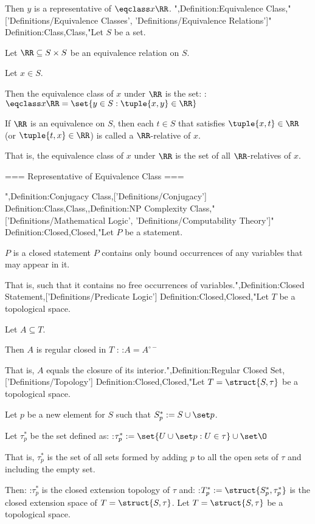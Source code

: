 Then $y$ is a representative of $\eqclass x \RR$.
",Definition:Equivalence Class,"['Definitions/Equivalence Classes', 'Definitions/Equivalence Relations']"
Definition:Class,Class,"Let $S$ be a set.

Let $\RR \subseteq S \times S$ be an equivalence relation on $S$.

Let $x \in S$.


Then the equivalence class of $x$ under $\RR$ is the set:
:$\eqclass x \RR = \set {y \in S: \tuple {x, y} \in \RR}$


If $\RR$ is an equivalence on $S$, then each $t \in S$ that satisfies $\tuple {x, t} \in \RR$ (or $\tuple {t, x} \in \RR$) is called a $\RR$-relative of $x$.


That is, the equivalence class of $x$ under $\RR$ is the set of all $\RR$-relatives of $x$.


=== Representative of Equivalence Class ===

",Definition:Conjugacy Class,['Definitions/Conjugacy']
Definition:Class,Class,,Definition:NP Complexity Class,"['Definitions/Mathematical Logic', 'Definitions/Computability Theory']"
Definition:Closed,Closed,"Let $P$ be a statement.

$P$ is a closed statement  $P$ contains only bound occurrences of any variables that may appear in it.


That is, such that it contains no free occurrences of variables.",Definition:Closed Statement,['Definitions/Predicate Logic']
Definition:Closed,Closed,"Let $T$ be a topological space.

Let $A \subseteq T$.


Then $A$ is regular closed in $T$ :
:$A = A^{\circ -}$

That is,  $A$ equals the closure of its interior.",Definition:Regular Closed Set,['Definitions/Topology']
Definition:Closed,Closed,"Let $T = \struct {S, \tau}$ be a topological space.

Let $p$ be a new element for $S$ such that $S^*_p := S \cup \set p$.


Let $\tau^*_p$ be the set defined as:
:$\tau^*_p := \set {U \cup \set p: U \in \tau} \cup \set \O$

That is, $\tau^*_p$ is the set of all sets formed by adding $p$ to all the open sets of $\tau$ and including the empty set.


Then:
:$\tau^*_p$ is the closed extension topology of $\tau$
and:
:$T^*_p := \struct {S^*_p, \tau^*_p}$ is the closed extension space of $T = \struct {S, \tau}$.
Let $T = \struct {S, \tau}$ be a topological space.

